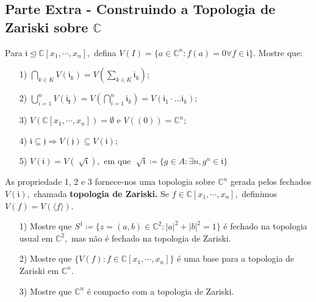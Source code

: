 \documentclass[algebraII_notes.tex]{subfiles}
\begin{document}
\subsection{Parte Extra - Construindo a Topologia de Zariski sobre \(\mathbb{C}\)}
Para \(\mathfrak{i}\trianglelefteq{\mathbb{C}[x_{1}, \cdots, x_{n}]},\) defina \(V(I) = \{a\in \mathbb{C}^{n}: f(a) = 0 \forall f\in \mathfrak{i}\}\).
Mostre que:
\begin{itemize}
	\item[1)] \(\bigcap_{k\in K}^{}{V(\mathfrak{i}_{k})} = V(\sum\limits_{k\in K}^{}\mathfrak{i}_{k})\);
	\item[2)] \(\bigcup_{i=1}^{n}{V(\mathfrak{i_{k}})} = V(\bigcap_{i=1}^{n}{\mathfrak{i}_{k}}) = V(\mathfrak{i}_{1}\cdot \dotsc \mathfrak{i}_{k})\);
	\item[3)] \(V(\mathbb{C}[x_{1}, \cdots, x_{n}]) = \emptyset\) e \(V((0)) = \mathbb{C}^{n}\);
	\item[4)] \(\mathfrak{i}\subseteq{\mathfrak{j}} \Rightarrow V(\mathfrak{j}) \subseteq{} V(\mathfrak{i})\);
	\item[5)] \(V(\mathfrak{i}) = V(\sqrt[]{\mathfrak{i}}),\) em que \(\sqrt[]{\mathfrak{i}}\coloneqq \{g\in A: \exists n, g^{n}\in \mathfrak{i}\}\)
\end{itemize}
As propriedade 1, 2 e 3 fornece-nos uma topologia sobre \(\mathbb{C}^{n}\) gerada pelos fechados \(V(\mathfrak{i}),\) chamada \textbf{topologia de Zariski.} Se
\(f\in \mathbb{C}[x_{1}, \cdots, x_{n}],\) definimos \(V(f) = V(\langle f \rangle)\).
\begin{itemize}
	\item[1)] Mostre que \(S^{1}\coloneqq \{z=(a, b)\in \mathbb{C}^{2}: |a|^{2} + |b|^{2}=1\}\) é fechado na topologia usual em
	      \(\mathbb{C}^{2},\) mas não é fechado na topologia de Zariski.
	\item[2)] Mostre que \(\{V(f): f\in \mathbb{C}[x_{1}, \cdots, x_{n}]\}\) é uma base para a topologia de Zariski em \(\mathbb{C}^{n}.\)
	\item[3)] Mostre que \(\mathbb{C}^{n}\) é compacto com a topologia de Zariski.
\end{itemize}
\end{document}
